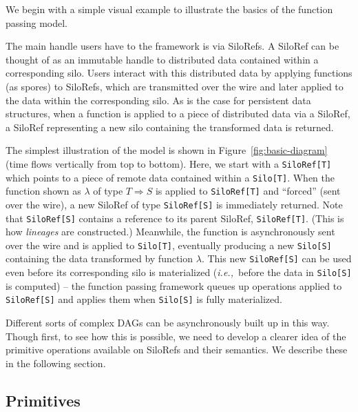 \documentclass{jfp1}
\newcommand{\ie}{{\em i.e.,~}}
\begin{document}
We begin with a simple visual example to illustrate the basics of the function
passing model. %

The main handle users have to the framework is via SiloRefs. A SiloRef can be
thought of as an immutable handle to distributed data contained within a
corresponding silo. Users interact with this distributed data by applying
functions (as spores) to SiloRefs, which are transmitted over the wire and later
applied to the data within the corresponding silo. As is the case for persistent
data structures, when a function is applied to a piece of distributed data via a
SiloRef, a SiloRef representing a new silo containing the transformed data is
returned.

The simplest illustration of the model is shown in
Figure~\ref{fig:basic-diagram} (time flows vertically from top to bottom). Here,
we start with a \verb|SiloRef[T]| which points to a piece of remote data
contained within a \verb|Silo[T]|. When the function shown as $\lambda$ of type
$T \Rightarrow S$ is applied to \verb|SiloRef[T]| and ``forced'' (sent over the
wire), a new SiloRef of type \verb|SiloRef[S]| is immediately returned. Note
that \verb|SiloRef[S]| contains a reference to its parent SiloRef,
\verb|SiloRef[T]|. (This is how {\em lineages} are constructed.) Meanwhile, the
function is asynchronously sent over the wire and is applied to \verb|Silo[T]|,
eventually producing a new \verb|Silo[S]| containing the data transformed by
function $\lambda$. This new \verb|SiloRef[S]| can be used even before its
corresponding silo is materialized (\ie before the data in \verb|Silo[S]| is
computed) – the function passing framework queues up operations applied to
\verb|SiloRef[S]| and applies them when \verb|Silo[S]| is fully materialized.

Different sorts of complex DAGs can be asynchronously built up in this way.
Though first, to see how this is possible, we need to develop a clearer idea of
the primitive operations available on SiloRefs and their semantics. We describe
these in the following section.

\subsection{Primitives}
\label{sec:primitives}
\end{document}
